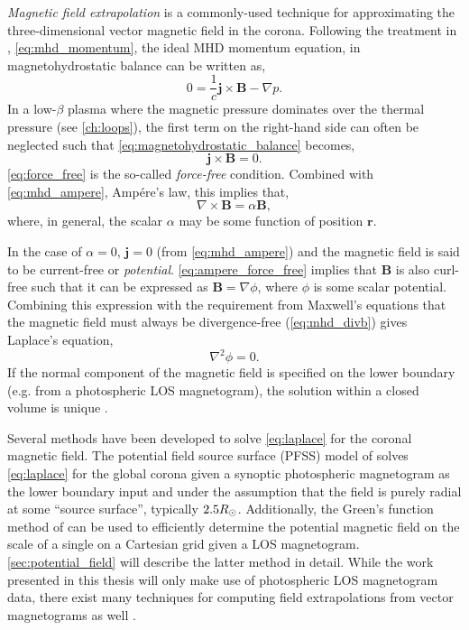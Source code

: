 \textit{Magnetic field extrapolation} is a commonly-used technique for approximating the three-dimensional vector magnetic field in the corona. Following the treatment in \citet[Chapter 3]{priest_magnetohydrodynamics_2014}, \autoref{eq:mhd_momentum}, the ideal MHD momentum equation, in magnetohydrostatic balance can be written as,
\begin{equation}\label{eq:magnetohydrostatic_balance}
    0 = \frac{1}{c}\mathbf{j}\times\mathbf{B} - \nabla p.
\end{equation}
In a low-$\beta$ plasma where the magnetic pressure dominates over the thermal pressure (see \autoref{ch:loops}), the first term on the right-hand side can often be neglected such that \autoref{eq:magnetohydrostatic_balance} becomes,
\begin{equation}\label{eq:force_free}
    \mathbf{j}\times\mathbf{B} = 0.
\end{equation}
\autoref{eq:force_free} is the so-called \textit{force-free} condition. Combined with \autoref{eq:mhd_ampere}, Amp\'{e}re's law, this implies that,
\begin{equation}\label{eq:ampere_force_free}
    \nabla\times\mathbf{B} = \alpha\mathbf{B},
\end{equation}
where, in general, the scalar $\alpha$ may be some function of position $\mathbf{r}$.

In the case of $\alpha=0$, $\mathbf{j}=0$ (from \autoref{eq:mhd_ampere}) and the magnetic field is said to be current-free or \textit{potential}. \autoref{eq:ampere_force_free} implies that $\mathbf{B}$ is also curl-free such that it can be expressed as $\mathbf{B}=\nabla\phi$, where $\phi$ is some scalar potential. Combining this expression with the requirement from Maxwell's equations that the magnetic field must always be divergence-free (\autoref{eq:mhd_divb}) gives Laplace's equation,
\begin{equation}\label{eq:laplace}
    \nabla^2\phi = 0.
\end{equation}
If the normal component of the magnetic field is specified on the lower boundary (e.g. from a photospheric LOS magnetogram), the solution within a closed volume is unique \citep{priest_magnetohydrodynamics_2014}.

Several methods have been developed to solve \autoref{eq:laplace} for the coronal magnetic field. The potential field source surface (PFSS) model of \citet{schatten_model_1969} solves \autoref{eq:laplace} for the global corona given a synoptic photospheric magnetogram as the lower boundary input and under the assumption that the field is purely radial at some ``source surface'', typically $2.5R_{\odot}$. Additionally, the Green's function method of \citet{schmidt_observable_1964} can be used to efficiently determine the potential magnetic field on the scale of a single \AR{} on a Cartesian grid given a LOS magnetogram. \autoref{sec:potential_field} will describe the latter method in detail. While the work presented in this thesis will only make use of photospheric LOS magnetogram data, there exist many techniques for computing field extrapolations from vector magnetograms as well \citep[see review by][]{welsch_deriving_2016}.

